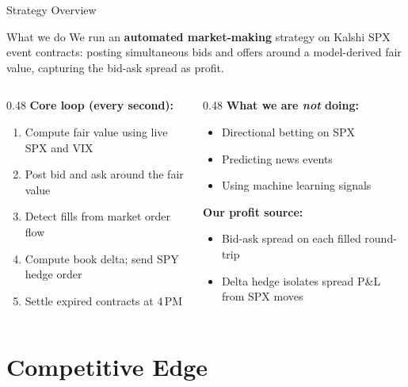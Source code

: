 \documentclass[aspectratio=169]{beamer}
\begin{document}
\begin{frame}{Strategy Overview}
  \begin{block}{What we do}
    We run an \textbf{automated market-making} strategy on Kalshi SPX event contracts:
    posting simultaneous bids and offers around a model-derived fair value, capturing
    the bid-ask spread as profit.
  \end{block}
  \vspace{0.4em}
  \begin{columns}[T]
    \begin{column}{0.48\textwidth}
      \textbf{Core loop (every second):}
      \begin{enumerate}\small
        \item Compute fair value using live SPX and VIX
        \item Post bid and ask around the fair value
        \item Detect fills from market order flow
        \item Compute book delta; send SPY hedge order
        \item Settle expired contracts at 4\,PM
      \end{enumerate}
    \end{column}
    \begin{column}{0.48\textwidth}
      \textbf{What we are \emph{not} doing:}
      \begin{itemize}\small
        \item Directional betting on SPX
        \item Predicting news events
        \item Using machine learning signals
      \end{itemize}
      \vspace{0.4em}
      \textbf{Our profit source:}
      \begin{itemize}\small
        \item Bid-ask spread on each filled round-trip
        \item Delta hedge isolates spread P\&L from SPX moves
      \end{itemize}
    \end{column}
  \end{columns}
\end{frame}

\section{Competitive Edge}
\end{document}

